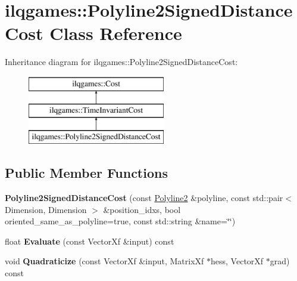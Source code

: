 \hypertarget{classilqgames_1_1_polyline2_signed_distance_cost}{}\section{ilqgames\+:\+:Polyline2\+Signed\+Distance\+Cost Class Reference}
\label{classilqgames_1_1_polyline2_signed_distance_cost}
Inheritance diagram for ilqgames\+:\+:Polyline2\+Signed\+Distance\+Cost\+:\begin{figure}[H]
\begin{center}
\leavevmode
\includegraphics[height=3.000000cm]{classilqgames_1_1_polyline2_signed_distance_cost}
\end{center}
\end{figure}
\subsection*{Public Member Functions}
\begin{DoxyCompactItemize}
\item 
{\bfseries Polyline2\+Signed\+Distance\+Cost} (const \hyperlink{classilqgames_1_1_polyline2}{Polyline2} \&polyline, const std\+::pair$<$ Dimension, Dimension $>$ \&position\+\_\+idxs, bool oriented\+\_\+same\+\_\+as\+\_\+polyline=true, const std\+::string \&name=\char`\"{}\char`\"{})\hypertarget{classilqgames_1_1_polyline2_signed_distance_cost_a444d14956d2335b60e928e0394e86221}{}\label{classilqgames_1_1_polyline2_signed_distance_cost_a444d14956d2335b60e928e0394e86221}

\item 
float {\bfseries Evaluate} (const Vector\+Xf \&input) const \hypertarget{classilqgames_1_1_polyline2_signed_distance_cost_acf991d382328987f0757fa299d58f869}{}\label{classilqgames_1_1_polyline2_signed_distance_cost_acf991d382328987f0757fa299d58f869}

\item 
void {\bfseries Quadraticize} (const Vector\+Xf \&input, Matrix\+Xf $\ast$hess, Vector\+Xf $\ast$grad) const \hypertarget{classilqgames_1_1_polyline2_signed_distance_cost_a26d830bf62ef4b4e0827f8cbf779b21c}{}\label{classilqgames_1_1_polyline2_signed_distance_cost_a26d830bf62ef4b4e0827f8cbf779b21c}

\end{DoxyCompactItemize}
